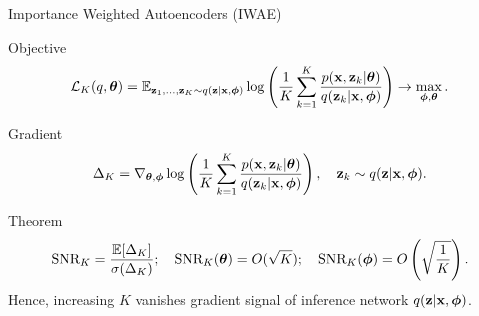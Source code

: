 \begin{frame}{Importance Weighted Autoencoders (IWAE)}
	\begin{block}{Objective}
		\vspace{-0.5cm}
		\[
		\mathcal{L}_K (q, \boldsymbol{\theta})  = \mathbb{E}_{\mathbf{z}_1, \dots, \mathbf{z}_K \sim q(\mathbf{z} | \mathbf{x}, \boldsymbol{\phi})} \log \left( \frac{1}{K}\sum_{k=1}^K\frac{p(\mathbf{x}, \mathbf{z}_k | \boldsymbol{\theta})}{q(\mathbf{z}_k| \mathbf{x}, \boldsymbol{\phi})} \right) \rightarrow \max_{\boldsymbol{\phi}, \boldsymbol{\theta}}.
		\]
		\vspace{-0.3cm}
	\end{block}
	\begin{block}{Gradient}
		\vspace{-0.3cm}
		\[
		\Delta_K = \nabla_{\boldsymbol{\theta}, \boldsymbol{\phi}} \log \left( \frac{1}{K}\sum_{k=1}^K\frac{p(\mathbf{x}, \mathbf{z}_k | \boldsymbol{\theta})}{q(\mathbf{z}_k| \mathbf{x}, \boldsymbol{\phi})} \right), \quad \mathbf{z}_k \sim q(\mathbf{z} | \mathbf{x}, \boldsymbol{\phi}).
		\]
		\vspace{-0.3cm}
	\end{block}
	\begin{block}{Theorem}
		\vspace{-0.4cm}
		\[
		\text{SNR}_K = \frac{\mathbb{E} [\Delta_K]}{\sigma(\Delta_K)}; \quad
		\text{SNR}_K(\boldsymbol{\theta}) = O(\sqrt{K}); \quad 
		\text{SNR}_K(\boldsymbol{\phi}) = O\left(\sqrt{\frac{1}{K}}\right).
		\]
		Hence, increasing $K$ vanishes gradient signal of inference network $q(\mathbf{z} | \mathbf{x}, \boldsymbol{\phi})$.
	\end{block}
	
\end{frame}
